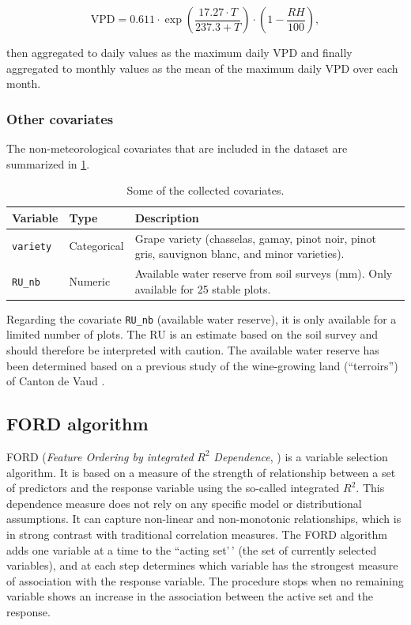 \[\text{VPD} = 0.611 \cdot \exp\left( \frac{17.27 \cdot T}{237.3 + T} \right) \cdot \left( 1 - \frac{RH}{100} \right),\]

then aggregated to daily values as the maximum daily VPD and finally aggregated to monthly values as the mean of the maximum daily VPD over each month.

\subsubsection{Other covariates}

The non-meteorological covariates that are included in the dataset are summarized in \cref{tab:covariates}.

\begin{table}[tbp]
\centering
\caption{Some of the collected covariates.}\label{tab:covariates}
\begin{tabular}{@{}l l p{}@{}}
\toprule
\textbf{Variable} & \textbf{Type} & \textbf{Description} \\
\midrule
\texttt{variety} & Categorical & Grape variety (chasselas, gamay, pinot noir, pinot gris, sauvignon blanc, and minor varieties). \\
\texttt{RU\_nb} & Numeric & Available water reserve from soil surveys (mm).  Only available for 25 stable plots. \\
\bottomrule
\end{tabular}
\end{table}

Regarding the covariate \texttt{RU\_nb} (available water reserve), it is only available for a limited number of plots. The RU is an estimate based on the soil survey and should therefore be interpreted with caution. The available water reserve has been determined based on a previous study of the wine-growing land  (``terroirs'') of Canton de Vaud \citep{letessier_etude_2004}.

\subsection{FORD algorithm}

FORD (\emph{Feature Ordering by integrated} \(R^{2}\) \emph{Dependence}, \citealp{azadkia_new_2025}) is a variable selection algorithm. It is based on a measure of the strength of relationship between a set of predictors and the response variable using the so-called integrated \(R^{2}\). This dependence measure does not rely on any specific model or distributional assumptions. It can capture non-linear and non-monotonic relationships, which is in strong contrast with traditional correlation measures. The FORD algorithm adds one variable at a time to the ``acting set'\,' (the set of currently selected variables), and at each step determines which variable has the strongest measure of association with the response variable. The procedure stops when no remaining variable shows an increase in the association between the active set and the response.

